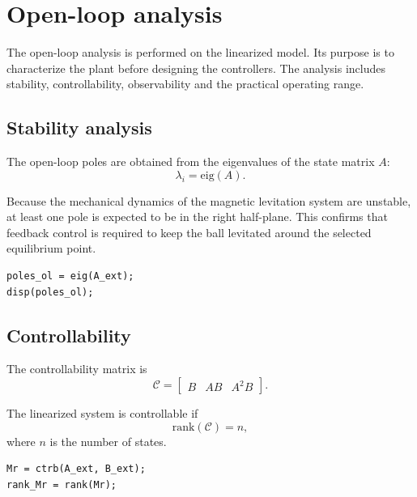 \section{Open-loop analysis}

The open-loop analysis is performed on the linearized model. Its purpose is to characterize the plant before designing the controllers. The analysis includes stability, controllability, observability and the practical operating range.

\subsection{Stability analysis}

The open-loop poles are obtained from the eigenvalues of the state matrix $A$:
\begin{equation}
    \lambda_i = \mathrm{eig}(A).
\end{equation}

Because the mechanical dynamics of the magnetic levitation system are unstable, at least one pole is expected to be in the right half-plane. This confirms that feedback control is required to keep the ball levitated around the selected equilibrium point.

\begin{lstlisting}[style=matlabstyle,caption={Open-loop pole computation in MATLAB.}]
poles_ol = eig(A_ext);
disp(poles_ol);
\end{lstlisting}

\subsection{Controllability}

The controllability matrix is
\begin{equation}
    \mathcal{C} = \begin{bmatrix} B & AB & A^2B \end{bmatrix}.
\end{equation}

The linearized system is controllable if
\begin{equation}
    \mathrm{rank}(\mathcal{C}) = n,
\end{equation}
where $n$ is the number of states.

\begin{lstlisting}[style=matlabstyle,caption={Controllability check.}]
Mr = ctrb(A_ext, B_ext);
rank_Mr = rank(Mr);
\end{lstlisting}


